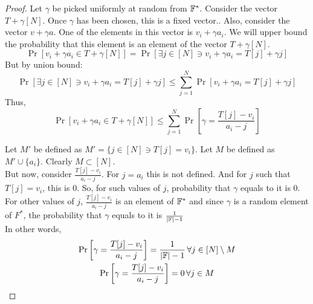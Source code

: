 \begin{proof}
    Let $\gamma$ be picked uniformly at random from $\mathbb{F}^*$.
    Consider the vector $T+\gamma[N]$. Once $\gamma$ has been chosen, this is a fixed vector..
    Also, consider the vector $v+\gamma a$. One of the elements in this vector is $v_i +\gamma a_i$.
    We will upper bound the probability that this element is an element of the vector $T+\gamma[N]$. \\
    $$\Pr[v_i +\gamma a_i \in T+\gamma[N]]=\Pr[\exists j \in [N] \ni v_i +\gamma a_i=T[j]+\gamma j]$$
    But by union bound:
    $$\Pr[\exists j \in [N] \ni v_i +\gamma a_i=T[j]+\gamma j] \leq \sum_{j=1}^N \Pr[v_i +\gamma a_i=T[j]+\gamma j]$$
    Thus,
    $$\Pr[v_i +\gamma a_i \in T+\gamma[N]] \leq \sum_{j=1}^N \Pr\left[\gamma = \frac{T[j]-v_i}{a_i-j}\right] $$

    Let $M'$ be defined as $M'=\{j\in [N] \ni T[j]=v_i \}$.
    Let $M$ be defined as $M' \cup \{a_i\}$. Clearly $M \subset [N]$.\\
    But now, consider $\frac{T[j]-v_i}{a_i-j}$. For $j=a_i$ this is not defined. And for $j$ such that $T[j]=v_i$, this is 0. So, for such values of $j$, probability that $\gamma$ equals to it is $0$.
    For other values of $j$, $\frac{T[j]-v_i}{a_i-j}$ is an element of $\mathbb{F}^{*}$ and since $\gamma$ is a random element of $F^{*}$, the probability that $\gamma$ equals to it is $\frac{1}{|\mathbb{F}|-1}$\\
    In other words,
    \begin{gather}
        \Pr\left[\gamma = \frac{T[j]-v_i}{a_i-j}\right]=\frac{1}{|\mathbb{F}|-1}\, \forall j \in [N]\setminus M\\
        \Pr\left[\gamma = \frac{T[j]-v_i}{a_i-j}\right]=0 \, \forall j \in M
    \end{gather}


\end{proof}
